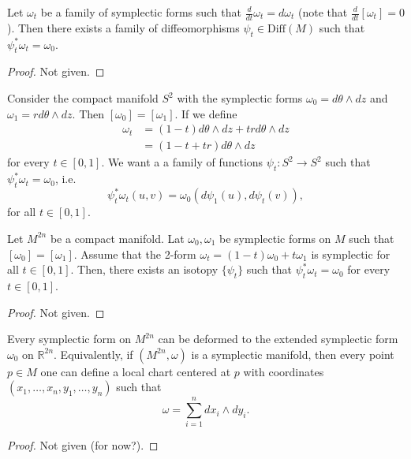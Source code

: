 \documentclass[misc]{subfiles}
\begin{document}
\begin{Thm}[Moser]
    Let $\omega_t$ be a family of symplectic forms such that $\frac{d}{dt}\omega_t = d\omega_t$ (note that $\frac{d}{dt}[\omega_t]=0$). Then there exists a family of diffeomorphisms $\psi_t\in\text{Diff}(M)$ such that $\psi_t^\ast\omega_t = \omega_0$.

    \begin{proof}
    
        Not given.
    \end{proof}
\end{Thm}

\begin{Exp}
    Consider the compact manifold $S^2$ with the symplectic forms $\omega_0=d\theta\wedge dz$ and $\omega_1=rd\theta\wedge dz$. Then $[\omega_0]=[\omega_1]$. If we define
    \begin{align*}
        \omega_t &= (1-t)d\theta\wedge dz + trd\theta\wedge dz \\
                 &= (1-t+tr)d\theta\wedge dz
    \end{align*}
    for every $t\in[0,1]$. We want a a family of functions $\psi_t:S^2\to S^2$ such that $\psi_t^\ast\omega_t=\omega_0$, i.e.
    \[
    \psi_t^\ast\omega_t(u,v) = \omega_0(d\psi_1(u), d\psi_t(v)),
    \] 
    for all $t\in[0,1]$. %
    
\end{Exp}

\begin{Lmm}
    Let $M^{2n}$ be a compact manifold. Lat $\omega_0,\omega_1$ be symplectic forms on $M$ such that $[\omega_0]=[\omega_1]$. Assume that the 2-form $\omega_t = (1-t)\omega_0+t\omega_1$ is symplectic for all $t\in[0,1]$. Then, there exists an isotopy $\{\psi_t\}$ such that $\psi_t^\ast\omega_t=\omega_0$ for every $t\in[0,1]$.

    \begin{proof}
    
        Not given.
    \end{proof}
\end{Lmm}

\begin{Thm}[Darboux]\label{Thm: Darboux's Theorem}
    Every symplectic form on $M^{2n}$ can be deformed to the extended symplectic form $\omega_0$ on $\mathbb{R}^{2n}$. Equivalently, if $(M^{2n},\omega)$ is a symplectic manifold, then every point $p\in M$ one can define a local chart centered at $p$ with coordinates $(x_1,\dots,x_n,y_1,\dots,y_n)$ such that
    \[
    \omega = \sum_{i=1}^n dx_i\wedge dy_i.
    \] 

    \begin{proof}
    
        Not given (for now?).
    \end{proof}
\end{Thm}
\end{document}
